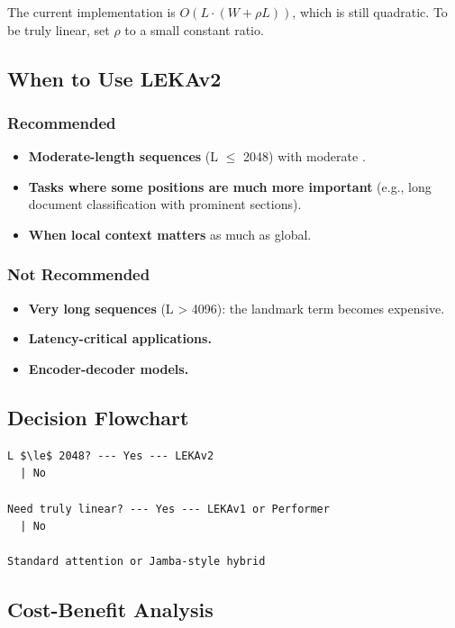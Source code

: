The current implementation is $O(L \cdot (W + \rho L))$, which is 
still quadratic. To be truly linear, set $\rho$ to a small constant 
ratio.

\subsection{When to Use LEKAv2}

\subsubsection{Recommended}
\begin{itemize}
\item \textbf{Moderate-length sequences} (L $\le$ 2048) with moderate  .
\item \textbf{Tasks where some positions are much more important} (e.g., long
  document classification with prominent sections).
\item \textbf{When local context matters} as much as global.

\end{itemize}
\subsubsection{Not Recommended}
\begin{itemize}
\item \textbf{Very long sequences} (L \textgreater{} 4096): the landmark term becomes expensive.
\item \textbf{Latency-critical applications.}
\item \textbf{Encoder-decoder models.}

\end{itemize}
\subsection{Decision Flowchart}

\begin{lstlisting}
L $\le$ 2048? --- Yes --- LEKAv2
  | No
   
Need truly linear? --- Yes --- LEKAv1 or Performer
  | No
   
Standard attention or Jamba-style hybrid
\end{lstlisting}

\subsection{Cost-Benefit Analysis}

